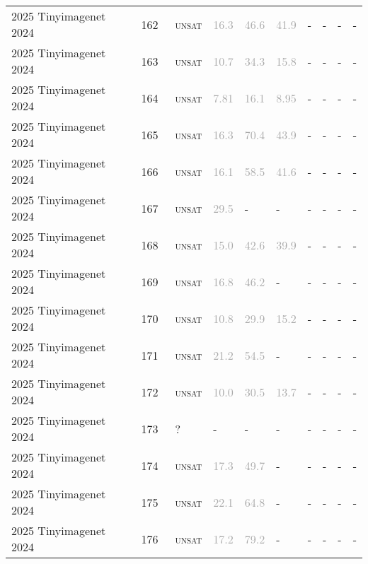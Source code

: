 \begin{center}
{\begin{longtable}{@{}llllllllll@{}}
2025 Tinyimagenet 2024 & 162 & ~\textsc{unsat} & \textcolor{darkgray}{16.3} & \textcolor{darkgray}{46.6} & \textcolor{darkgray}{41.9} & - & - & - & - \\
2025 Tinyimagenet 2024 & 163 & ~\textsc{unsat} & \textcolor{darkgray}{10.7} & \textcolor{darkgray}{34.3} & \textcolor{darkgray}{15.8} & - & - & - & - \\
2025 Tinyimagenet 2024 & 164 & ~\textsc{unsat} & \textcolor{darkgray}{7.81} & \textcolor{darkgray}{16.1} & \textcolor{darkgray}{8.95} & - & - & - & - \\
2025 Tinyimagenet 2024 & 165 & ~\textsc{unsat} & \textcolor{darkgray}{16.3} & \textcolor{darkgray}{70.4} & \textcolor{darkgray}{43.9} & - & - & - & - \\
2025 Tinyimagenet 2024 & 166 & ~\textsc{unsat} & \textcolor{darkgray}{16.1} & \textcolor{darkgray}{58.5} & \textcolor{darkgray}{41.6} & - & - & - & - \\
2025 Tinyimagenet 2024 & 167 & ~\textsc{unsat} & \textcolor{darkgray}{29.5} & - & - & - & - & - & - \\
2025 Tinyimagenet 2024 & 168 & ~\textsc{unsat} & \textcolor{darkgray}{15.0} & \textcolor{darkgray}{42.6} & \textcolor{darkgray}{39.9} & - & - & - & - \\
2025 Tinyimagenet 2024 & 169 & ~\textsc{unsat} & \textcolor{darkgray}{16.8} & \textcolor{darkgray}{46.2} & - & - & - & - & - \\
2025 Tinyimagenet 2024 & 170 & ~\textsc{unsat} & \textcolor{darkgray}{10.8} & \textcolor{darkgray}{29.9} & \textcolor{darkgray}{15.2} & - & - & - & - \\
2025 Tinyimagenet 2024 & 171 & ~\textsc{unsat} & \textcolor{darkgray}{21.2} & \textcolor{darkgray}{54.5} & - & - & - & - & - \\
2025 Tinyimagenet 2024 & 172 & ~\textsc{unsat} & \textcolor{darkgray}{10.0} & \textcolor{darkgray}{30.5} & \textcolor{darkgray}{13.7} & - & - & - & - \\
2025 Tinyimagenet 2024 & 173 & ~? & - & - & - & - & - & - & - \\
2025 Tinyimagenet 2024 & 174 & ~\textsc{unsat} & \textcolor{darkgray}{17.3} & \textcolor{darkgray}{49.7} & - & - & - & - & - \\
2025 Tinyimagenet 2024 & 175 & ~\textsc{unsat} & \textcolor{darkgray}{22.1} & \textcolor{darkgray}{64.8} & - & - & - & - & - \\
2025 Tinyimagenet 2024 & 176 & ~\textsc{unsat} & \textcolor{darkgray}{17.2} & \textcolor{darkgray}{79.2} & - & - & - & - & - \\

\end{longtable}}
\end{center}
